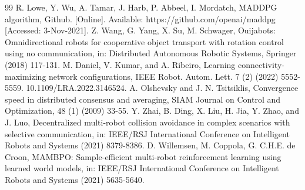 \documentclass[letterpaper, 10 pt, conference]{ieeeconf} %
\begin{document}
\begin{thebibliography}{99}
 R. Lowe, Y. Wu, A. Tamar, J. Harb, P. Abbeel, I. Mordatch, MADDPG algorithm, Github. [Online]. Available: https://github.com/openai/maddpg [Accessed: 3-Nov-2021].
 Z. Wang, G. Yang, X. Su, M. Schwager, Ouijabots: Omnidirectional robots for cooperative object transport with rotation control using no communication, in: Distributed Autonomous Robotic Systems, Springer (2018) 117-131.
 M. Daniel, V. Kumar, and A. Ribeiro, Learning connectivity-maximizing network configurations, IEEE Robot. Autom. Lett. 7 (2) (2022) 5552-5559. 10.1109/LRA.2022.3146524.
 A. Olshevsky and J. N. Tsitsiklis, Convergence speed in distributed consensus and averaging, SIAM Journal on Control and Optimization, 48 (1) (2009) 33-55.
 Y. Zhai, B. Ding, X. Liu, H. Jia, Y. Zhao, and J. Luo, Decentralized multi-robot collision avoidance in complex scenarios with selective communication, in: IEEE/RSJ International Conference on Intelligent Robots and Systems (2021) 8379-8386.
 D. Willemsen, M. Coppola, G. C.H.E. de Croon, MAMBPO: Sample-efficient multi-robot reinforcement learning using learned world models, in: IEEE/RSJ International Conference on Intelligent Robots and Systems (2021) 5635-5640.
\end{thebibliography}











\end{document}
